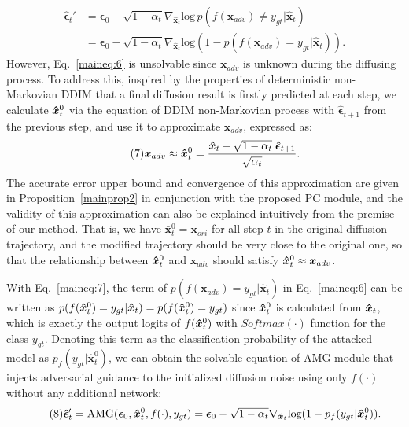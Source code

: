 \documentclass{article}
\begin{document}
\begin{equation}\tag{6}
\begin{aligned}
    \boldsymbol{\hat{\epsilon}}_t' & = \boldsymbol{\epsilon}_0 - \sqrt{1-\alpha_t}\nabla_{\boldsymbol{\hat{x}}_t}\text{log}\,p(f(\boldsymbol{x}_{adv}) \neq y_{gt}|\boldsymbol{\hat{x}}_{t}) \\
                                  & = \boldsymbol{{\epsilon}}_{0} - \sqrt{1-\alpha_t}\nabla_{\boldsymbol{\hat{x}}_t}\text{log}(1-p(f(\boldsymbol{x}_{adv})=y_{gt}|\boldsymbol{\hat{x}}_{t})).
\end{aligned}
\label{maineq:6}
\end{equation}
However, Eq.~\eqref{maineq:6} is unsolvable since $\boldsymbol{x}_{adv}$ is unknown during the diffusing process. To address this, inspired by the properties of deterministic non-Markovian DDIM that a final diffusion result is firstly predicted at each step, we calculate $\boldsymbol{\Hat{x}}_t^0$ via the {equation of DDIM non-Markovian process} with $\boldsymbol{\hat{\epsilon}}_{t+1}$ from the previous step, and use it to approximate $\boldsymbol{x}_{adv}$, expressed as:
\begin{equation}\tag{7}
    \boldsymbol{x}_{adv} \approx \boldsymbol{\Hat{x}}_t^0 = \frac{\boldsymbol{\Hat{x}}_t - \sqrt{1-\alpha_t}\;\boldsymbol{\hat{\epsilon}}_{t+1}}{\sqrt{\alpha_t}}.
\label{maineq:7}
\end{equation}
The accurate error upper bound and convergence of this approximation are given in Proposition~\ref{mainprop2} in conjunction with the proposed PC module, and the validity of this approximation can also be explained intuitively from the premise of our method. That is, we have $\boldsymbol{\bar{x}}_t^0=\boldsymbol{x}_{ori}$ for all step $t$ in the original diffusion trajectory, and the modified trajectory should be very close to the original one, so that the relationship between $\boldsymbol{\Hat{x}}_t^0$ and $\boldsymbol{x}_{adv}$ should satisfy $\boldsymbol{\Hat{x}}_t^0 \approx \boldsymbol{x}_{adv}$. 


With  Eq.~\eqref{maineq:7}, the term of $p(f(\boldsymbol{x}_{adv})=y_{gt}|\boldsymbol{\hat{x}}_{t})$ in Eq.~\eqref{maineq:6}  can be written as $p(f(\boldsymbol{\Hat{x}}_t^0)=y_{gt}|\boldsymbol{\hat{x}}_{t}) = p(f(\boldsymbol{\Hat{x}}_t^0)=y_{gt})$ since $\boldsymbol{\Hat{x}}_t^0$ is calculated from $\boldsymbol{\Hat{x}}_t$, which is exactly the output logits of $f(\boldsymbol{\Hat{x}}_t^0)$ with $Softmax(\cdot)$ function for the class $y_{gt}$. Denoting this term as the classification probability of the attacked model as $p_f(y_{gt}|\boldsymbol{\hat{x}}_t^0)$, we can obtain the solvable equation of AMG module that injects adversarial guidance to the initialized diffusion noise {using only $f(\cdot)$ without any additional network}:
\begin{equation}\tag{8}
    \boldsymbol{\hat{\epsilon}}'_t = \text{AMG}(\boldsymbol{\epsilon}_0, \boldsymbol{\Hat{x}}_{t}^{0}, f(\cdot), y_{gt}) =  \boldsymbol{\epsilon}_0 - \sqrt{1-\alpha_t}\nabla_{\boldsymbol{\Hat{x}}_t}\text{log}(1-p_f(y_{gt}|\boldsymbol{\Hat{x}}_{t}^{0})).
\label{maineq:8}
\end{equation}
\end{document}
